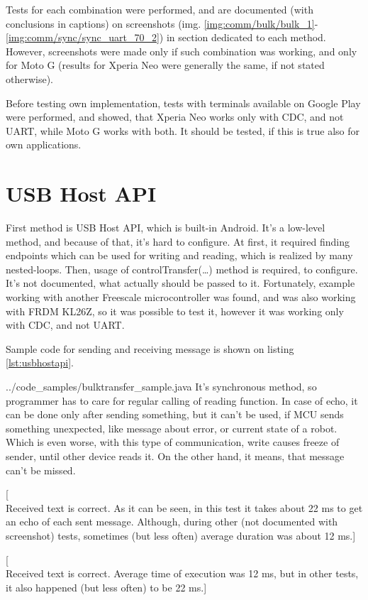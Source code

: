 Tests for each combination were performed, and are documented (with conclusions
in captions) on screenshots (img.
\ref{img:comm/bulk/bulk_1}-\ref{img:comm/sync/sync_uart_70_2}) in section
dedicated to each method.
However, screenshots were made only if such combination was working, and only
for Moto G (results for Xperia Neo were generally the same, if not stated
otherwise).

Before testing own implementation, tests with terminals available on Google Play
were performed, and showed, that Xperia Neo works only with CDC, and not UART,
while Moto G works with both.
It should be tested, if this is true also for own applications.

\section{USB Host API}
First method is USB Host API, which is built-in Android. 
It's a low-level method, and because of that, it's hard to configure.
At first, it required finding endpoints which can be used for writing and
reading, which is realized by many nested-loops.
Then, usage of controlTransfer(\ldots) method is required, to configure.
It's not documented, what actually should be passed to it.
Fortunately, example working with another Freescale microcontroller was found,
and was also working with FRDM KL26Z, so it was possible to test it, however it
was working only with CDC, and not UART.

Sample code for sending and receiving message is shown on listing
\ref{lst:usbhostapi}.

{../code_samples/bulktransfer_sample.java}
It's synchronous method, so programmer has to care for regular calling of
reading function.
In case of echo, it can be done only after sending something, but it can't be
used, if MCU sends something unexpected, like message about error, or current
state of a robot.
Which is even worse, with this type of communication, write causes freeze of
sender, until other device reads it.
On the other hand, it means, that message can't be missed.

[\\Received text is correct. 
As it can be seen, in this test it takes about 22 ms to get an echo of each sent
message.
Although, during other (not documented with screenshot) tests, sometimes (but
less often) average duration was about 12 ms.]

[\\Received text is correct. 
Average time of execution was 12 ms, but in other tests, it also happened (but
less often) to be 22 ms.]

